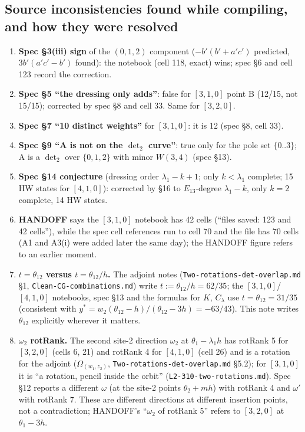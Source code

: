 \documentclass[11pt]{article}
\newcommand{\Om}{\Omega}
\newcommand{\nb}[1]{\texttt{#1}}
\begin{document}
\subsection{Source inconsistencies found while compiling, and how they were resolved}
\begin{enumerate}
\item \textbf{Spec \S3(iii) sign} of the $(0,1,2)$ component ($-b'(b'+a'c')$ predicted, $3b'(a'c'-b')$ found): the notebook (cell 118, exact) wins; spec \S6 and cell 123 record the correction.
\item \textbf{Spec \S5 ``the dressing only adds''}: false for $[3,1,0]$ point B (12/15, not 15/15); corrected by spec \S8 and cell 33. Same for $[3,2,0]$.
\item \textbf{Spec \S7 ``10 distinct weights''} for $[3,1,0]$: it is 12 (spec \S8, cell 33).
\item \textbf{Spec \S9 ``A is not on the $\det_2$ curve''}: true only for the pole set $\{0..3\}$; A is a $\det_2$ over $\{0,1,2\}$ with minor $W(3,4)$ (spec \S13).
\item \textbf{Spec \S14 conjecture} (dressing order $\lambda_1-k+1$; only $k<\lambda_1$ complete; 15 HW states for $[4,1,0]$): corrected by \S16 to $E_{13}$-degree $\lambda_1-k$, only $k=2$ complete, 14 HW states.
\item \textbf{HANDOFF} says the $[3,1,0]$ notebook has 42 cells (``files saved: 123 and 42 cells''), while the spec cell references run to cell 70 and the file has 70 cells (A1 and A3(i) were added later the same day); the HANDOFF figure refers to an earlier moment.
\item \textbf{$t=\theta_{12}$ versus $t=\theta_{12}/h$.} The adjoint notes (\nb{Two-rotations-det-overlap.md} \S1, \nb{Clean-CG-combinations.md}) write $t:=\theta_{12}/h=62/35$; the $[3,1,0]$/$[4,1,0]$ notebooks, spec \S13 and the formulas for $K$, $C_\lambda$ use $t=\theta_{12}=31/35$ (consistent with $y^*=w_2(\theta_{12}-h)/(\theta_{12}-3h)=-63/43$). This note writes $\theta_{12}$ explicitly wherever it matters.
\item \textbf{$\omega_2$ rotRank.} The second site-2 direction $\omega_2$ at $\theta_1-\lambda_1h$ has rotRank 5 for $[3,2,0]$ (cells 6, 21) and rotRank 4 for $[4,1,0]$ (cell 26) and is a rotation for the adjoint ($\Om_{(w_1,z_2)}$, \nb{Two-rotations-det-overlap.md} \S5.2); for $[3,1,0]$ it is ``a rotation, pencil inside the orbit'' (\nb{L2-310-two-rotations.md}). Spec \S12 reports a different $\omega$ (at the site-2 points $\theta_2+mh$) with rotRank 4 and $\omega'$ with rotRank 7. These are different directions at different insertion points, not a contradiction; HANDOFF's ``$\omega_2$ of rotRank 5'' refers to $[3,2,0]$ at $\theta_1-3h$.

\end{enumerate}
\end{document}
